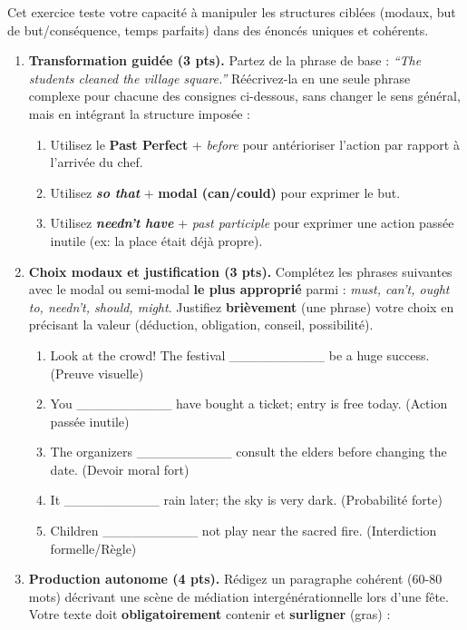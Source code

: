 \documentclass[11pt]{article}
\begin{document}
\begin{exercice}
Cet exercice teste votre capacité à manipuler les structures ciblées (modaux, but de but/conséquence, temps parfaits) dans des énoncés uniques et cohérents.

\begin{enumerate}
    \item \textbf{Transformation guidée (3 pts).} Partez de la phrase de base : \textit{``The students cleaned the village square.''} Réécrivez-la en une seule phrase complexe pour chacune des consignes ci-dessous, sans changer le sens général, mais en intégrant la structure imposée :
    \begin{enumerate}
        \item Utilisez le \textbf{Past Perfect} + \textit{before} pour antérioriser l'action par rapport à l'arrivée du chef.
        \item Utilisez \textbf{\textit{so that}} + \textbf{modal (can/could)} pour exprimer le but.
        \item Utilisez \textbf{\textit{needn't have}} + \textit{past participle} pour exprimer une action passée inutile (ex: la place était déjà propre).
    \end{enumerate}
    \item \textbf{Choix modaux et justification (3 pts).} Complétez les phrases suivantes avec le modal ou semi-modal \textbf{le plus approprié} parmi : \textit{must, can't, ought to, needn't, should, might}. Justifiez \textbf{brièvement} (une phrase) votre choix en précisant la valeur (déduction, obligation, conseil, possibilité).
    \begin{enumerate}
        \item Look at the crowd! The festival \_\_\_\_\_\_\_\_\_\_ be a huge success. (Preuve visuelle)
        \item You \_\_\_\_\_\_\_\_\_\_ have bought a ticket; entry is free today. (Action passée inutile)
        \item The organizers \_\_\_\_\_\_\_\_\_\_ consult the elders before changing the date. (Devoir moral fort)
        \item It \_\_\_\_\_\_\_\_\_\_ rain later; the sky is very dark. (Probabilité forte)
        \item Children \_\_\_\_\_\_\_\_\_\_ not play near the sacred fire. (Interdiction formelle/Règle)
    \end{enumerate}
    \item \textbf{Production autonome (4 pts).} Rédigez un paragraphe cohérent (60-80 mots) décrivant une scène de médiation intergénérationnelle lors d'une fête. Votre texte doit \textbf{obligatoirement} contenir et \textbf{surligner} (gras) :

\end{enumerate}
\end{exercice}
\end{document}
